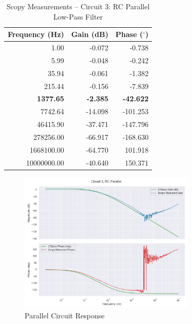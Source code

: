 \documentclass[12pt]{article}
\begin{document}
\begin{table}[H]
	\centering
	\begin{tabular}{|r|r|r|}
		\hline
		\textbf{Frequency (Hz)} & \textbf{Gain (dB)} & \textbf{Phase ($^\circ$)} \\
		\hline
		1.00                    & -0.072             & -0.738                    \\
		5.99                    & -0.048             & -0.242                    \\
		35.94                   & -0.061             & -1.382                    \\
		215.44                  & -0.156             & -7.839                    \\
		\textbf{1377.65}        & \textbf{-2.385}    & \textbf{-42.622}          \\
		7742.64                 & -14.098            & -101.253                  \\
		46415.90                & -37.471            & -147.796                  \\
		278256.00               & -66.917            & -168.630                  \\
		1668100.00              & -64.770            & 101.918                   \\
		10000000.00             & -40.640            & 150.371                   \\
		\hline
	\end{tabular}
	\caption{Scopy Measurements – Circuit 3: RC Parallel Low-Pass Filter}
\end{table}
\begin{figure}[H]
	\centering
	\includegraphics[width=0.75\textwidth]{e6_bode3}
	\caption{Parallel Circuit Response}
	\label{fig:scopycircthree}
\end{figure}
\end{document}
